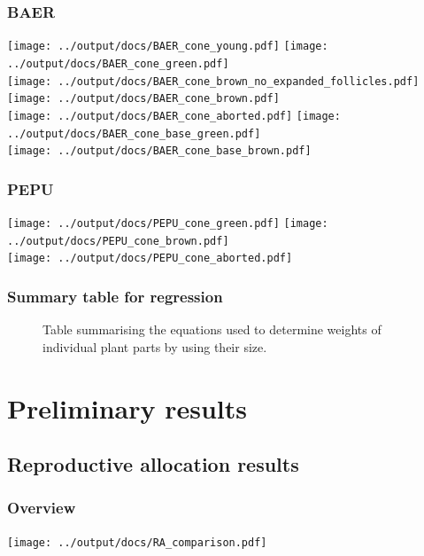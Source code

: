 \documentclass[10pt]{book} %
\begin{document}
\subsection{BAER}
\begin{center}
\texttt{[image: ../output/docs/BAER\_cone\_young.pdf]}
\texttt{[image: ../output/docs/BAER\_cone\_green.pdf]}\\
\texttt{[image: ../output/docs/BAER\_cone\_brown\_no\_expanded\_follicles.pdf]}
\texttt{[image: ../output/docs/BAER\_cone\_brown.pdf]}\\
\texttt{[image: ../output/docs/BAER\_cone\_aborted.pdf]}
\texttt{[image: ../output/docs/BAER\_cone\_base\_green.pdf]}\\
\texttt{[image: ../output/docs/BAER\_cone\_base\_brown.pdf]}
\end{center}

\subsection{PEPU}
\begin{center}
\texttt{[image: ../output/docs/PEPU\_cone\_green.pdf]}
\texttt{[image: ../output/docs/PEPU\_cone\_brown.pdf]}\\
\texttt{[image: ../output/docs/PEPU\_cone\_aborted.pdf]}
\end{center}
\newpage
\subsection{Summary table for regression}
\begin{figure}[h!]
\begin{center}

\end{center}
\caption{Table summarising the equations used to determine weights of individual plant parts by using their size.}
\end{figure}

\chapter{Preliminary results}
\section{Reproductive allocation results}
\subsection{Overview}
\texttt{[image: ../output/docs/RA\_comparison.pdf]}
\end{document}
